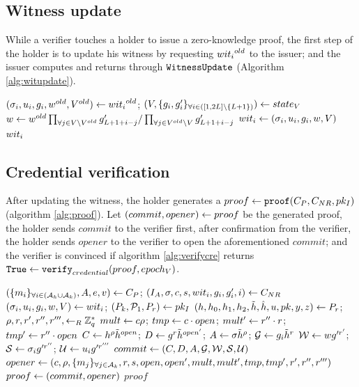 \documentclass{article}
\begin{document}
\subsection{Witness update}
While a verifier touches a holder to issue a zero-knowledge proof, the first step of the holder is to update his witness by requesting ${wit_{i} }^{old}$ to the issuer; and the issuer computes and returns through $\mathtt{WitnessUpdate}$ (Algorithm \ref{alg:witupdate}).

\begin{algorithm}
\caption{$\mt{updateWitness}(\old{\witi }, \stv)$}
\label{alg:witupdate}
\begin{algorithmic}
	\State $(\sigma _{i}, u_{i}, g_{i}, {w}^{old}, {V}^{old})\leftarrow {wit_{i}}^{old}$; $(V, \{{g_{i}, g'_{i}}\}_{\forall i\in ([{1, {2L}}]\backslash \{{L+1}\})} ) \leftarrow state_{V}$
	\State $w \leftarrow {w}^{old} \prod _{\forall j\in V \backslash {V}^{old}}g'_{L + 1 + i - j} / \prod _{\forall j\in {V}^{old} \backslash V}g'_{L + 1 + i - j} $
	\State $wit_{i} \leftarrow (\sigma _{i}, u_{i}, g_{i}, w, V)$
	\State \Return $wit_{i} $
\end{algorithmic}
\end{algorithm}

\subsection{Credential verification}
After updating the witness, the holder generates a $proof\leftarrow \mathtt{proof}(C_{P} , C_{NR} ,pk_{I} ) $ (algorithm \ref{alg:proof}). Let $(commit, opener)\leftarrow proof$ be the generated proof, the holder sends $commit$ to the verifier first, after confirmation from the verifier, the holder sends $opener$ to the verifier to open the aforementioned $commit$; and the verifier is convinced if algorithm \ref{alg:verifycre} returns $\texttt{True} \leftarrow \mathtt{verify} _{credential}(proof, epoch_{V} ) $.

\begin{algorithm}
\caption{$\proofp $}
\label{alg:proof}
\begin{algorithmic}
	\State $(\{{m_i}\}_{\forall i\in (\mathcal{A}_{h} \cup \mathcal{A}_{k} )}, A, e, v) \leftarrow C_{P}$; $(I_{A}, \sigma , c, s, wit_{i} , g_i, g'_i, i) \leftarrow C_{NR}$
	\State $(\sigma _{i}, u_{i}, g_{i}, w, V) \leftarrow wit_{i} $; $(P_{k} , \mathcal{P}_{1} , P_{r} ) \leftarrow pk_{I} $
	\State $(h, h_0, h_1, h_2, \tilde{h}, \hat{h}, u, pk, y, z) \leftarrow P_{r} $; $\rho , r, r', r'', r''', \leftarrow _{R} \mathbb{Z}_{q}^{*}$
	\State $mult\leftarrow c\rho $; $tmp\leftarrow c \cdot open$; $mult'\leftarrow r''\cdot r$; $tmp'\leftarrow r'' \cdot open$
	\State $C\leftarrow h^{\rho }\tilde{h}^{open}$; $D\leftarrow g^{r}\tilde{h}^{open'}$; $A\leftarrow \sigma \tilde{h}^{\rho }$; $\mathcal{G}\leftarrow g_{i}\tilde{h}^{r}$
	\State $\mathcal{W}\leftarrow wg'^{r'}$; $\mathcal{S}\leftarrow \sigma _{i}g'^{r''}$; $\mathcal{U}\leftarrow u_{i}g'^{r'''}$
	\State $commit\leftarrow (C, D, A, \mathcal{G}, \mathcal{W}, \mathcal{S}, \mathcal{U}) $ 
	\State $opener\leftarrow (c, \rho , \{{m_{j}}\}_{\forall j\in \mathcal{A}_{k}}, r, s, open, open', mult, mult', tmp, tmp', r', r'', r''') $
	\State $proof\leftarrow (commit, opener)$
	\State \Return $proof$
\end{algorithmic}
\end{algorithm}
\end{document}
